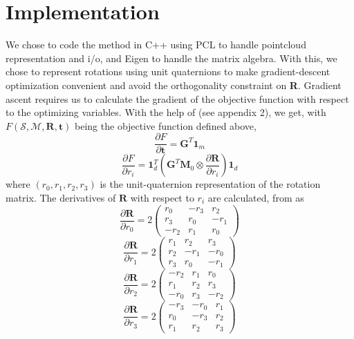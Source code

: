 \documentclass[11pt, a4paper]{article}
\begin{document}
\section{Implementation}
We chose to code the method in C++ using PCL to handle pointcloud representation and i/o, and Eigen to handle the matrix algebra. With this, we chose to represent rotations using unit quaternions to make gradient-descent optimization convenient and avoid the orthogonality constraint on \textbf{R}.
\linebreak \linebreak
\noindent Gradient ascent requires us to calculate the gradient of the objective function with respect to the optimizing variables. With the help of \cite{mainPre} (see appendix 2), we get, with $F(\mathcal{S}, \mathcal{M}, \textbf{R}, \textbf{t})$ being the objective function defined above, $$\frac{\partial F}{\partial \textbf{t}} = \textbf{G}^T\textbf{1}_m$$ $$\frac{\partial F}{\partial r_i} = \textbf{1}_d^T \left(\textbf{G}^T\textbf{M}_0 \otimes \frac{\partial \textbf{R}}{\partial r_i}\right)\textbf{1}_d$$ where $(r_0, r_1, r_2, r_3)$ is the unit-quaternion representation of the rotation matrix.
\linebreak \linebreak
\noindent
The derivatives of $\textbf{R}$ with respect to $r_i$ are calculated, from \cite{quatParam} as
$$\frac{\partial \textbf{R}}{\partial r_0} = 2\begin{pmatrix}
  r_0 & -r_3 & r_2 \\
  r_3 & r_0 & -r_1 \\
  -r_2 & r_1 & r_0
 \end{pmatrix}$$
$$\frac{\partial \textbf{R}}{\partial r_1} = 2\begin{pmatrix}
  r_1 & r_2 & r_3 \\
  r_2 & -r_1 & -r_0 \\
  r_3 & r_0 & -r_1
 \end{pmatrix}$$
$$\frac{\partial \textbf{R}}{\partial r_2} = 2\begin{pmatrix}
  -r_2 & r_1 & r_0 \\
  r_1 & r_2 & r_3 \\
  -r_0 & r_3 & -r_2
 \end{pmatrix}$$
$$\frac{\partial \textbf{R}}{\partial r_3} = 2\begin{pmatrix}
  -r_3 & -r_0 & r_1 \\
  r_0 & -r_3 & r_2 \\
  r_1 & r_2 & r_3
 \end{pmatrix}$$
\end{document}
